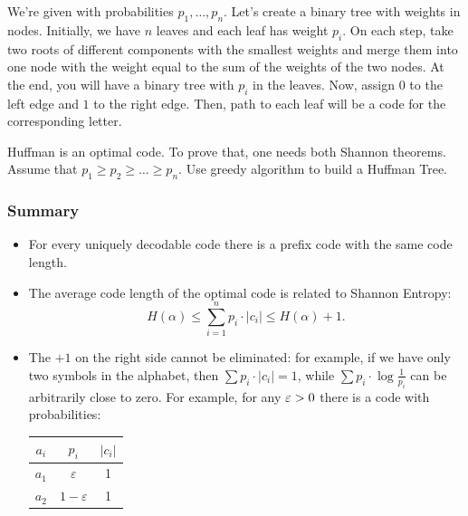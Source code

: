 \begin{example}
	We're given with probabilities $p_1, \ldots, p_n$.
	Let's create a binary tree with weights in nodes.
	Initially, we have $n$ leaves and each leaf has weight $p_i$.
	On each step, take two roots of different components with the smallest weights and merge them into one node with the weight equal to the sum of the weights of the two nodes.
	At the end, you will have a binary tree with $p_i$ in the leaves.
	Now, assign $0$ to the left edge and $1$ to the right edge.
	Then, path to each leaf will be a code for the corresponding letter.

    Huffman is an optimal code.
    To prove that, one needs both Shannon theorems.
    Assume that $p_{1} \ge p_{2} \ge \dots \ge p_{n}$.
    Use greedy algorithm to build a Huffman Tree.
\end{example}

\subsubsection{Summary}

\begin{itemize}
    \item For every uniquely decodable code there is a prefix code with the same code length.
    \item The average code length of the optimal code is related to Shannon Entropy:
    \[
        H(\alpha) \le \sum _{ i = 1 }^{ n } p_{i} \cdot |c_{i}| \le H(\alpha) + 1.
    \]
    \item The $+1$ on the right side cannot be eliminated: for example, if we have only two symbols in the alphabet, then $\sum p_{i} \cdot |c_{i}| = 1$, while $\sum p_{i} \cdot \log \frac{1}{p_{i}}$ can be arbitrarily close to zero.
    For example, for any $\varepsilon > 0$ there is a code with probabilities:

    \begin{center}
    \begin{tabular}{|c|c|c|}
        \hline
        $a_{i}$ & $p_{i}$ & $|c_{i}|$ \\
        \hline
        $a_{1}$ & $\varepsilon$ & 1 \\
        $a_{2}$ & $1 - \varepsilon$ & 1 \\
        \hline
    \end{tabular}
    \end{center}
\end{itemize}

